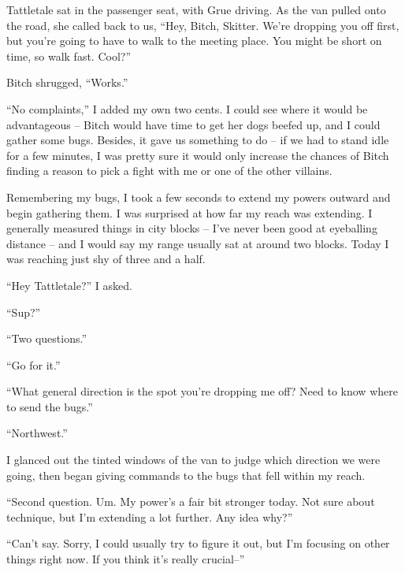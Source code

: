 Tattletale sat in the passenger seat, with Grue driving.  As the van pulled onto the road, she called back to us, ``Hey, Bitch, Skitter.  We're dropping you off first, but you're going to have to walk to the meeting place.  You might be short on time, so walk fast.  Cool?''



Bitch shrugged, ``Works.''



``No complaints,'' I added my own two cents.  I could see where it would be advantageous – Bitch would have time to get her dogs beefed up, and I could gather some bugs.  Besides, it gave us something to do – if we had to stand idle for a few minutes, I was pretty sure it would only increase the chances of Bitch finding a reason to pick a fight with me or one of the other villains.



Remembering my bugs, I took a few seconds to extend my powers outward and begin gathering them.  I was surprised at how far my reach was extending.  I generally measured things in city blocks – I've never been good at eyeballing distance – and I would say my range usually sat at around two blocks.  Today I was reaching just shy of three and a half.



``Hey Tattletale?'' I asked.



``Sup?''



``Two questions.''



``Go for it.''



``What general direction is the spot you're dropping me off?  Need to know where to send the bugs.''



``Northwest.''



I glanced out the tinted windows of the van to judge which direction we were going, then began giving commands to the bugs that fell within my reach.



``Second question.  Um.  My power's a fair bit stronger today.  Not sure about technique, but I'm extending a lot further.  Any idea why?''



``Can't say.  Sorry, I could usually try to figure it out, but I'm focusing on other things right now.  If you think it's really crucial--''




